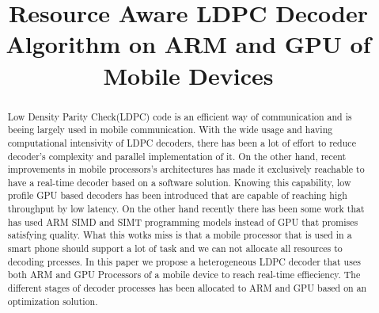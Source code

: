 \documentclass[conference]{IEEEtran}
\begin{document}
\title{Resource Aware LDPC Decoder Algorithm on ARM and GPU of Mobile Devices}

\author{
\and
{}
\and
{}
}



\maketitle

\begin{abstract}
Low Density Parity Check(LDPC) code is an efficient way of communication and is beeing largely used in mobile communication. With the wide usage and having computational intensivity of LDPC decoders, there has been a lot of effort to reduce decoder's complexity and parallel implementation of it. On the other hand, recent improvements in mobile processors's architectures has made it exclusively reachable to have a real-time decoder based on a software solution. Knowing this capability, low profile GPU based decoders has been introduced that are capable of reaching high throughput by low latency. On the other hand recently there has been some work that has used ARM SIMD and SIMT programming models instead of GPU that promises satisfying quality. What this wotks miss is that a mobile processor that is used in a smart phone should support a lot of task and we can not allocate all resources to decoding prcesses. In this paper we propose a heterogeneous LDPC decoder that uses both ARM and GPU Processors of a mobile device to reach real-time effieciency. The different stages of decoder processes has been allocated to ARM and GPU based on an optimization solution. 
\end{abstract}
\end{document}
